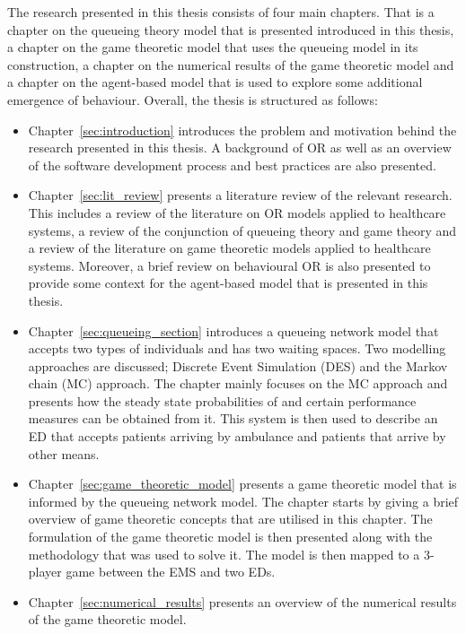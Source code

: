 The research presented in this thesis consists of four main chapters.
That is a chapter on the queueing theory model that is presented introduced
in this thesis, a chapter on the game theoretic model that uses the queueing
model in its construction, a chapter on the numerical results of the game
theoretic model and a chapter on the agent-based model that is used to
explore some additional emergence of behaviour.
Overall, the thesis is structured as follows:
\begin{itemize}
    \item Chapter~\ref{sec:introduction} introduces the problem and
    motivation behind the research presented in this thesis.
    A background of OR as well as an overview of the
    software development process and best practices are also presented.
    \item Chapter~\ref{sec:lit_review} presents a literature review of the
    relevant research.
    This includes a review of the literature on OR models
    applied to healthcare systems, a review of the conjunction of queueing
    theory and game theory and a review of the literature on game theoretic
    models applied to healthcare systems.
    Moreover, a brief review on behavioural OR is also presented to provide
    some context for the agent-based model that is presented in this thesis.
    \item Chapter~\ref{sec:queueing_section} introduces a queueing network
    model that accepts two types of individuals and has two waiting spaces.
    Two modelling approaches are discussed; Discrete Event Simulation (DES) and
    the Markov chain (MC) approach.
    The chapter mainly focuses on the MC approach and presents how the steady
    state probabilities of and certain performance measures can be obtained
    from it.
    This system is then used to describe an ED that accepts patients arriving
    by ambulance and patients that arrive by other means.
    \item Chapter~\ref{sec:game_theoretic_model} presents a game theoretic
    model that is informed by the queueing network model.
    The chapter starts by giving a brief overview of game theoretic concepts
    that are utilised in this chapter.
    The formulation of the game theoretic model is then presented along with
    the methodology that was used to solve it.
    The model is then mapped to a 3-player game between the EMS and two EDs.
    \item Chapter~\ref{sec:numerical_results} presents an overview of the
    numerical results of the game theoretic model.

\end{itemize}

